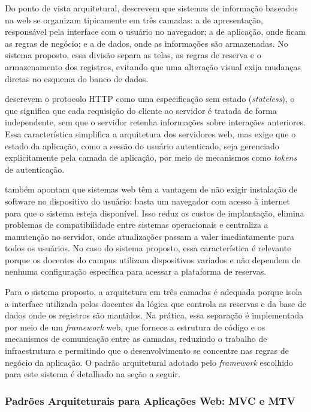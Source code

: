 \documentclass[
	12pt,				%
	twoside,			%
	openany,			%
	a4paper,			%
	chapter=TITLE,		%
	section=TITLE,		%
	subsection=TITLE,	%
	subsubsection=TITLE,%
	english,			%
	french,				%
	spanish,			%
	brazil,				%
	]{abntex2}
\begin{document}
Do ponto de vista arquitetural,  descrevem que sistemas de informação baseados na web se organizam tipicamente em três camadas: a de apresentação, responsável pela interface com o usuário no navegador; a de aplicação, onde ficam as regras de negócio; e a de dados, onde as informações são armazenadas. No sistema proposto, essa divisão separa as telas, as regras de reserva e o armazenamento dos registros, evitando que uma alteração visual exija mudanças diretas no esquema do banco de dados.

 descrevem o protocolo HTTP como uma especificação sem estado (\textit{stateless}), o que significa que cada requisição do cliente ao servidor é tratada de forma independente, sem que o servidor retenha informações sobre interações anteriores. Essa característica simplifica a arquitetura dos servidores web, mas exige que o estado da aplicação, como a sessão do usuário autenticado, seja gerenciado explicitamente pela camada de aplicação, por meio de mecanismos como \textit{tokens} de autenticação.

 também apontam que sistemas web têm a vantagem de não exigir instalação de software no dispositivo do usuário: basta um navegador com acesso à internet para que o sistema esteja disponível. Isso reduz os custos de implantação, elimina problemas de compatibilidade entre sistemas operacionais e centraliza a manutenção no servidor, onde atualizações passam a valer imediatamente para todos os usuários. No caso do sistema proposto, essa característica é relevante porque os docentes do campus utilizam dispositivos variados e não dependem de nenhuma configuração específica para acessar a plataforma de reservas.

Para o sistema proposto, a arquitetura em três camadas é adequada porque isola a interface utilizada pelos docentes da lógica que controla as reservas e da base de dados onde os registros são mantidos. Na prática, essa separação é implementada por meio de um \textit{framework} web, que fornece a estrutura de código e os mecanismos de comunicação entre as camadas, reduzindo o trabalho de infraestrutura e permitindo que o desenvolvimento se concentre nas regras de negócio da aplicação. O padrão arquitetural adotado pelo \textit{framework} escolhido para este sistema é detalhado na seção a seguir.

\subsubsection{Padrões Arquiteturais para Aplicações Web: MVC e MTV}
\label{sec:mvc_mtv}
\end{document}
